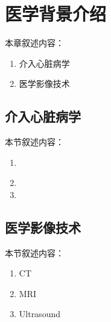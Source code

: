 \chapter{医学背景介绍}
\label{chap2}

本章叙述内容：
\begin{enumerate}
  \item 介入心脏病学
  \item 医学影像技术
\end{enumerate}

\section{介入心脏病学}

本节叙述内容：
\begin{enumerate}
  \item　
  \item
  \item
\end{enumerate}

\section{医学影像技术}

本节叙述内容：
\begin{enumerate}
  \item CT
  \item MRI
  \item Ultrasound
\end{enumerate}
